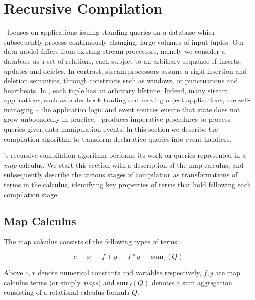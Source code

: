\section{Recursive Compilation}
\def\Dom{\mathrm{Dom}}
\def\algsum{\mathrm{sum}}
\def\algif{\mathrm{if}}
\def\algthen{\mathrm{then}}
\def\algelse{\mathrm{else}}
\def\algforeach{\mathrm{foreach}}

\newcommand\caret{\mathbin{\char`\^}}
\renewcommand{\algorithmiccomment}[1]{// #1}

\compiler\ focuses on applications issuing standing queries on a database which
subsequently process continuously changing, large volumes of input tuples.  Our
data model differs from existing stream processors, namely we consider a
database as a set of relations, each subject to an arbitrary sequence of
inserts, updates and deletes. In contrast, stream processors assume a rigid
insertion and deletion semantics, through constructs such as windows, or
punctuations and heartbeats. In \compiler, each tuple has an arbitrary
lifetime. Indeed, many stream applications, such as order book trading and
moving object applications, are self-managing -- the application logic and event
sources ensure that state does not grow unboundedly in practice.  \compiler\
produces imperative procedures to process queries given data manipulation
events. In this section we describe the compilation algorithm to transform
declarative queries into event handlers.

\compiler's recursive compilation algorithm performs its work on queries
represented in a \textit{map} calculus. We start this section with a description
of the map calculus, and subsequently describe the various stages of compilation
as transformations of terms in the calculus, identifying key properties of terms
that hold following each compilation stage.

\subsection{Map Calculus}
The map calculus consists of the following types of terms:

\[
c 
\quad\;\;
x
\quad\;\;
f+g
\quad\;\;
f*g
\quad\;\;
\algsum_f(Q)
\]

Above $c,x$ denote numerical constants and variables respectively, $f,g$ are map
calculus terms (or simply \textit{maps}) and $\algsum_f(Q)$ denotes a sum
aggregation consisting of a relational calculus formula $Q$.


